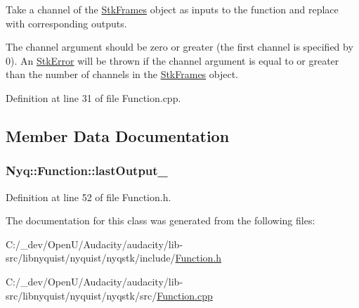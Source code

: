 Take a channel of the \hyperlink{class_nyq_1_1_stk_frames}{Stk\+Frames} object as inputs to the function and replace with corresponding outputs. 

The {\ttfamily channel} argument should be zero or greater (the first channel is specified by 0). An \hyperlink{class_nyq_1_1_stk_error}{Stk\+Error} will be thrown if the {\ttfamily channel} argument is equal to or greater than the number of channels in the \hyperlink{class_nyq_1_1_stk_frames}{Stk\+Frames} object. 

Definition at line 31 of file Function.\+cpp.



\subsection{Member Data Documentation}
\subsubsection[{\texorpdfstring{last\+Output\+\_\+}{lastOutput_}}]{ Nyq\+::\+Function\+::last\+Output\+\_\+\hspace{0.3cm}{\ttfamily [protected]}}\hypertarget{class_nyq_1_1_function_a5d8b62253fe4250c1493b4cf4de85f07}{}\label{class_nyq_1_1_function_a5d8b62253fe4250c1493b4cf4de85f07}


Definition at line 52 of file Function.\+h.



The documentation for this class was generated from the following files\+:\begin{DoxyCompactItemize}
\item 
C\+:/\+\_\+dev/\+Open\+U/\+Audacity/audacity/lib-\/src/libnyquist/nyquist/nyqstk/include/\hyperlink{_function_8h}{Function.\+h}\item 
C\+:/\+\_\+dev/\+Open\+U/\+Audacity/audacity/lib-\/src/libnyquist/nyquist/nyqstk/src/\hyperlink{_function_8cpp}{Function.\+cpp}\end{DoxyCompactItemize}
